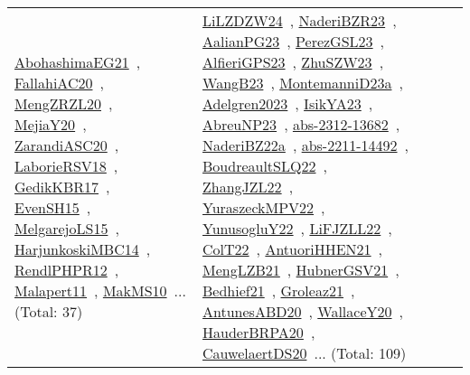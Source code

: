 {\begin{longtable}{lp{3cm}>{\raggedright\arraybackslash}p{6cm}>{\raggedright\arraybackslash}p{6cm}>{\raggedright\arraybackslash}p{8cm}}
\href{../works/AbohashimaEG21.pdf}{AbohashimaEG21}~\cite{AbohashimaEG21}, \href{../works/FallahiAC20.pdf}{FallahiAC20}~\cite{FallahiAC20}, \href{../works/MengZRZL20.pdf}{MengZRZL20}~\cite{MengZRZL20}, \href{../works/MejiaY20.pdf}{MejiaY20}~\cite{MejiaY20}, \href{../works/ZarandiASC20.pdf}{ZarandiASC20}~\cite{ZarandiASC20}, \href{../works/LaborieRSV18.pdf}{LaborieRSV18}~\cite{LaborieRSV18}, \href{../works/GedikKBR17.pdf}{GedikKBR17}~\cite{GedikKBR17}, \href{../works/EvenSH15.pdf}{EvenSH15}~\cite{EvenSH15}, \href{../works/MelgarejoLS15.pdf}{MelgarejoLS15}~\cite{MelgarejoLS15}, \href{../works/HarjunkoskiMBC14.pdf}{HarjunkoskiMBC14}~\cite{HarjunkoskiMBC14}, \href{../works/RendlPHPR12.pdf}{RendlPHPR12}~\cite{RendlPHPR12}, \href{../works/Malapert11.pdf}{Malapert11}~\cite{Malapert11}, \href{../works/MakMS10.pdf}{MakMS10}~\cite{MakMS10}... (Total: 37) & \href{../works/LiLZDZW24.pdf}{LiLZDZW24}~\cite{LiLZDZW24}, \href{../works/NaderiBZR23.pdf}{NaderiBZR23}~\cite{NaderiBZR23}, \href{../works/AalianPG23.pdf}{AalianPG23}~\cite{AalianPG23}, \href{../works/PerezGSL23.pdf}{PerezGSL23}~\cite{PerezGSL23}, \href{../works/AlfieriGPS23.pdf}{AlfieriGPS23}~\cite{AlfieriGPS23}, \href{../works/ZhuSZW23.pdf}{ZhuSZW23}~\cite{ZhuSZW23}, \href{../works/WangB23.pdf}{WangB23}~\cite{WangB23}, \href{../works/MontemanniD23a.pdf}{MontemanniD23a}~\cite{MontemanniD23a}, \href{../works/Adelgren2023.pdf}{Adelgren2023}~\cite{Adelgren2023}, \href{../works/IsikYA23.pdf}{IsikYA23}~\cite{IsikYA23}, \href{../works/AbreuNP23.pdf}{AbreuNP23}~\cite{AbreuNP23}, \href{../works/abs-2312-13682.pdf}{abs-2312-13682}~\cite{abs-2312-13682}, \href{../works/NaderiBZ22a.pdf}{NaderiBZ22a}~\cite{NaderiBZ22a}, \href{../works/abs-2211-14492.pdf}{abs-2211-14492}~\cite{abs-2211-14492}, \href{../works/BoudreaultSLQ22.pdf}{BoudreaultSLQ22}~\cite{BoudreaultSLQ22}, \href{../works/ZhangJZL22.pdf}{ZhangJZL22}~\cite{ZhangJZL22}, \href{../works/YuraszeckMPV22.pdf}{YuraszeckMPV22}~\cite{YuraszeckMPV22}, \href{../works/YunusogluY22.pdf}{YunusogluY22}~\cite{YunusogluY22}, \href{../works/LiFJZLL22.pdf}{LiFJZLL22}~\cite{LiFJZLL22}, \href{../works/ColT22.pdf}{ColT22}~\cite{ColT22}, \href{../works/AntuoriHHEN21.pdf}{AntuoriHHEN21}~\cite{AntuoriHHEN21}, \href{../works/MengLZB21.pdf}{MengLZB21}~\cite{MengLZB21}, \href{../works/HubnerGSV21.pdf}{HubnerGSV21}~\cite{HubnerGSV21}, \href{../works/Bedhief21.pdf}{Bedhief21}~\cite{Bedhief21}, \href{../works/Groleaz21.pdf}{Groleaz21}~\cite{Groleaz21}, \href{../works/AntunesABD20.pdf}{AntunesABD20}~\cite{AntunesABD20}, \href{../works/WallaceY20.pdf}{WallaceY20}~\cite{WallaceY20}, \href{../works/HauderBRPA20.pdf}{HauderBRPA20}~\cite{HauderBRPA20}, \href{../works/CauwelaertDS20.pdf}{CauwelaertDS20}~\cite{CauwelaertDS20}... (Total: 109)\\

\end{longtable}}
